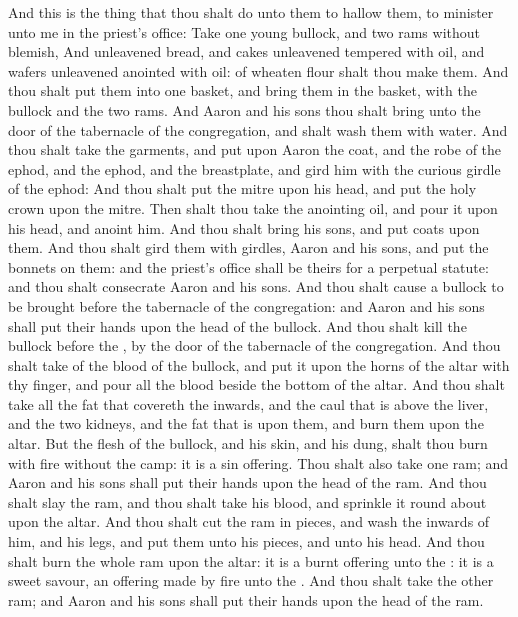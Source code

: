 \begin{biblechapter} %
 And this is the thing that thou shalt do unto them to hallow them, to minister unto me in the priest's office: Take one young bullock, and two rams without blemish,
\verse And unleavened bread, and cakes unleavened tempered with oil, and wafers unleavened anointed with oil: of wheaten flour shalt thou make them.
\verse And thou shalt put them into one basket, and bring them in the basket, with the bullock and the two rams.
\verse And Aaron and his sons thou shalt bring unto the door of the tabernacle of the congregation, and shalt wash them with water.
\verse And thou shalt take the garments, and put upon Aaron the coat, and the robe of the ephod, and the ephod, and the breastplate, and gird him with the curious girdle of the ephod:
\verse And thou shalt put the mitre upon his head, and put the holy crown upon the mitre.
\verse Then shalt thou take the anointing oil, and pour it upon his head, and anoint him.
\verse And thou shalt bring his sons, and put coats upon them.
\verse And thou shalt gird them with girdles, Aaron and his sons, and put the bonnets on them: and the priest's office shall be theirs for a perpetual statute: and thou shalt consecrate Aaron and his sons.
\verse And thou shalt cause a bullock to be brought before the tabernacle of the congregation: and Aaron and his sons shall put their hands upon the head of the bullock.
\verse And thou shalt kill the bullock before the \LORD, by the door of the tabernacle of the congregation.
\verse And thou shalt take of the blood of the bullock, and put it upon the horns of the altar with thy finger, and pour all the blood beside the bottom of the altar.
\verse And thou shalt take all the fat that covereth the inwards, and the caul that is above the liver, and the two kidneys, and the fat that is upon them, and burn them upon the altar.
\verse But the flesh of the bullock, and his skin, and his dung, shalt thou burn with fire without the camp: it is a sin offering.
\verse Thou shalt also take one ram; and Aaron and his sons shall put their hands upon the head of the ram.
\verse And thou shalt slay the ram, and thou shalt take his blood, and sprinkle it round about upon the altar.
\verse And thou shalt cut the ram in pieces, and wash the inwards of him, and his legs, and put them unto his pieces, and unto his head.
\verse And thou shalt burn the whole ram upon the altar: it is a burnt offering unto the \LORD: it is a sweet savour, an offering made by fire unto the \LORD.
\verse And thou shalt take the other ram; and Aaron and his sons shall put their hands upon the head of the ram.

\end{biblechapter}
